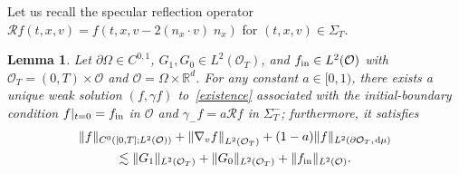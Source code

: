 \documentclass[10pt]{amsart}
\newtheorem{lemm}[theo]{Lemma}\newtheorem{prop}[theo]{Proposition}\newtheorem{coro}[theo]{Corollary}\newtheorem{conj}[theo]{Conjecture}
\theoremstyle{definition}\newtheorem{defi}[theo]{Definition}\newtheorem{rema}[theo]{Remark}\newtheorem{exam}[theo]{Example}\newtheorem{exem}[theo]{Example}\newtheorem{nota}[theo]{Notation}
\newcommand*{\dif}{\mathop{}\!\mathrm{d}}
\newcommand*\p{\partial}
\newcommand*\fin {f_{\rm in}}
\newcommand*\R {\mathbb{R}}
\newcommand*\RR {\mathcal{R}}
\newcommand*\OO {\mathcal{O}}
\begin{document}
Let us recall the specular reflection operator $\RR f(t,x,v)=f(t,x,v-2(n_x\cdot v)\;\!n_x)$ for $(t,x,v)\in\Sigma_T$.

\begin{lemm}\label{a01}
Let $\p\Omega\in C^{0,1}$, $G_1,G_0\in L^2(\OO_T)$, and $\fin\in L^2(\OO)$ with $\OO_T=(0,T)\times\OO$ and $\OO=\Omega\times\R^d$. For any constant $a\in[0,1)$, there exists a unique weak solution $(f,\gamma f)$ to~\eqref{existence} associated with the initial-boundary condition $f|_{t=0}=\fin$ in $\OO$ and $\gamma_-f=a\RR f$ in $\Sigma_T^-$; furthermore, it satisfies
\begin{multline}\label{dra}
\|f\|_{C^0\left([0,T];L^2(\OO)\right )} +\left\|\nabla_vf\right\|_{L^2(\OO_T)} +(1-a)\|f\|_{L^2\left(\p\OO_T,\;\!\dif\mu\right)}\\
\lesssim \|G_1\|_{L^2(\OO_T)} + \|G_0\|_{L^2(\OO_T)} + \|\fin\|_{L^2(\OO)} .
\end{multline}
\end{lemm}
\end{document}
